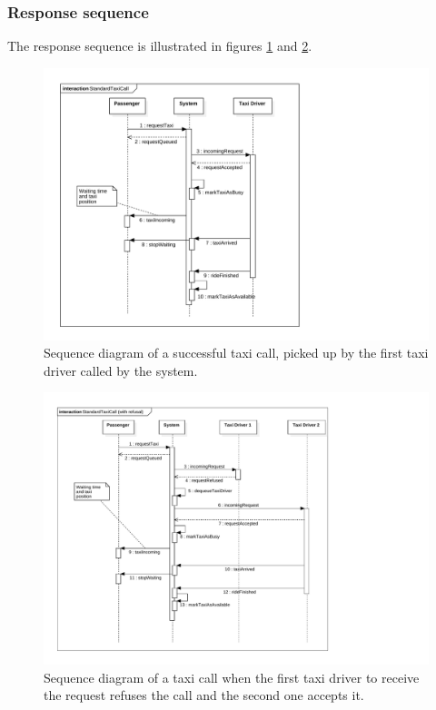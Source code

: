 \subsubsection{Response sequence}
The response sequence is illustrated in figures \ref{fig:sequence-taxicall} and \ref{fig:sequence-taxicall-refused}.

\begin{figure}
	\includegraphics[width=\textwidth]{diagrams/sequence_taxicall.pdf}
	\caption{Sequence diagram of a successful taxi call, picked up by the first taxi driver called by the system.}
	\label{fig:sequence-taxicall}
\end{figure}

\begin{figure}
	\includegraphics[width=\textwidth]{diagrams/sequence_taxicall_refused.pdf}
	\caption{Sequence diagram of a taxi call when the first taxi driver to receive the request refuses the call and the second one accepts it.}
	\label{fig:sequence-taxicall-refused}
\end{figure}

